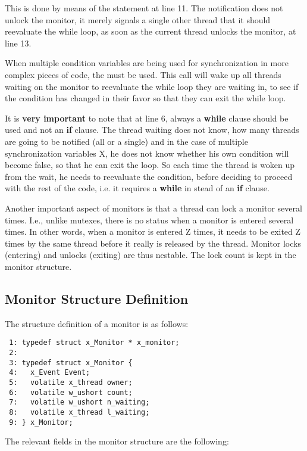 This is done by means of the  statement at line
11. The notification does not unlock the monitor, it merely signals a single
other thread that it should reevaluate the while loop, as soon as the
current thread unlocks the monitor, at line 13.

When multiple condition variables are being used for synchronization in more
complex pieces of code, the  must be used.
This call will wake up all threads waiting on the monitor to reevaluate the
while loop they are waiting in, to see if the condition has changed in their
favor so that they can exit the while loop.

It is \textbf{very important} to note that at line 6, always a
\textbf{while} clause should be used and not an \textbf{if} clause. The
thread waiting does not know, how many threads are going to be notified (all
or a single) and in the case of multiple synchronization variables X, he
does not know whether his own condition will become false, so that he can
exit the loop. So each time the thread is woken up from the wait, he needs
to reevaluate the condition, before deciding to proceed with the rest of the
code, i.e. it requires a \textbf{while} in stead of an \textbf{if} clause.

Another important aspect of monitors is that a thread can lock a monitor
several times. I.e., unlike mutexes, there is no  status
when a monitor is entered several times. In other words, when a monitor is
entered Z times, it needs to be exited Z times by the same thread before it
really is released by the thread. Monitor locks (entering) and unlocks
(exiting) are thus nestable. The lock count is kept in the monitor
structure.

\subsection{Monitor Structure Definition}

The structure definition of a monitor is as follows:

\bcode
\begin{verbatim}
 1: typedef struct x_Monitor * x_monitor;
 2:
 3: typedef struct x_Monitor {
 4:   x_Event Event;
 5:   volatile x_thread owner;
 6:   volatile w_ushort count;
 7:   volatile w_ushort n_waiting;
 8:   volatile x_thread l_waiting;
 9: } x_Monitor;
\end{verbatim}
\ecode

The relevant fields in the monitor structure are the following:


